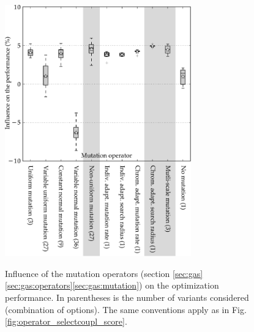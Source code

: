 \documentclass{ametsoc}
\begin{document}
\begin{figure}[t]
	\begin{center}
		\noindent\includegraphics[width=19pc,angle=0]{fig07.pdf}\\
	\end{center}
	\caption{Influence of the mutation operators (section \ref{sec:gas}\ref{sec:gas:operators}\ref{sec:gas:mutation}) on the optimization performance. In parentheses is the number of variants considered (combination of options). The same conventions apply as in Fig. \ref{fig:operator_selectcoupl_score}.}
	\label{fig:operator_mutation_score}
\end{figure}
\end{document}
